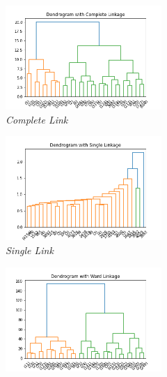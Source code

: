 \begin{figure}[h!]
    \centering
	\vspace*{-0.3cm}
    \begin{subfigure}{0.49\textwidth}
        \centering
        \includegraphics[width=0.65\textwidth]{img/clustering/complete_link.png}
        \caption{\emph{Complete Link}}
        \label{fig:complete_link}
    \end{subfigure}
    \begin{subfigure}{0.49\textwidth}
        \centering
        \includegraphics[width=0.65\textwidth]{img/clustering/single_link.png}
        \caption{\emph{Single Link}}
        \label{fig:single_link}
    \end{subfigure}
    \begin{subfigure}{0.49\textwidth}
        \centering
        \includegraphics[width=0.65\textwidth]{img/clustering/ward_link.png}

\end{subfigure}
\end{figure}

